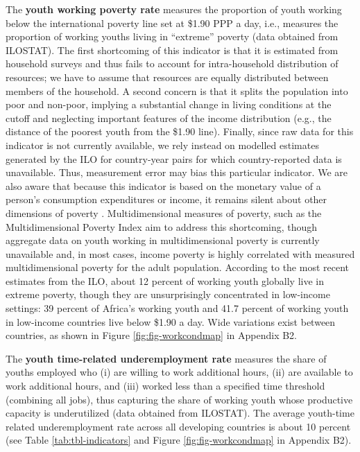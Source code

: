 \documentclass[
  a4paper, twoside, 12pt]{book}
\begin{document}
The \textbf{youth working poverty rate} measures the proportion of youth working below the international poverty line set at \$1.90 PPP a day, i.e., measures the proportion of working youths living in ``extreme'' poverty (data obtained from ILOSTAT). The first shortcoming of this indicator is that it is estimated from household surveys and thus fails to account for intra-household distribution of resources; we have to assume that resources are equally distributed between members of the household. A second concern is that it splits the population into poor and non-poor, implying a substantial change in living conditions at the cutoff and neglecting important features of the income distribution (e.g., the distance of the poorest youth from the \$1.90 line). Finally, since raw data for this indicator is not currently available, we rely instead on modelled estimates generated by the ILO for country-year pairs for which country-reported data is unavailable. Thus, measurement error may bias this particular indicator. We are also aware that because this indicator is based on the monetary value of a person's consumption expenditures or income, it remains silent about other dimensions of poverty \autocite{ophi2015}. Multidimensional measures of poverty, such as the Multidimensional Poverty Index \autocite{alkire2011} aim to address this shortcoming, though aggregate data on youth working in multidimensional poverty is currently unavailable and, in most cases, income poverty is highly correlated with measured multidimensional poverty for the adult population. According to the most recent estimates from the ILO, about 12 percent of working youth globally live in extreme poverty, though they are unsurprisingly concentrated in low-income settings: 39 percent of Africa's working youth and 41.7 percent of working youth in low-income countries live below \$1.90 a day. Wide variations exist between countries, as shown in Figure \ref{fig:fig-workcondmap} in Appendix B2.

The \textbf{youth time-related underemployment rate} measures the share of youths employed who (i) are willing to work additional hours, (ii) are available to work additional hours, and (iii) worked less than a specified time threshold (combining all jobs), thus capturing the share of working youth whose productive capacity is underutilized (data obtained from ILOSTAT). The average youth-time related underemployment rate across all developing countries is about 10 percent (see Table \ref{tab:tbl-indicators} and Figure \ref{fig:fig-workcondmap} in Appendix B2).
\end{document}
